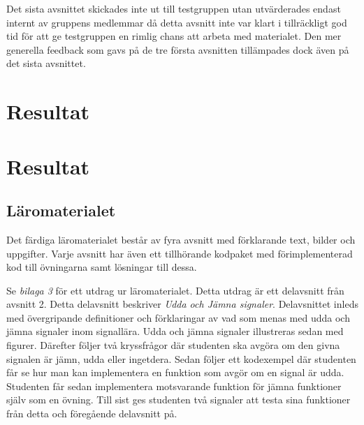 \documentclass[]{article}
\begin{document}
Det sista avsnittet skickades inte ut till testgruppen utan utvärderades endast internt av gruppens medlemmar då detta 
avsnitt inte var klart i tillräckligt god tid för att ge testgruppen en rimlig chans att arbeta med materialet. Den mer 
generella feedback som gavs på de tre första avsnitten tillämpades dock även på det sista avsnittet.


\section{Resultat}


%

\section{Resultat}


%

\subsection{Läromaterialet}
Det färdiga läromaterialet består av fyra avsnitt med förklarande text, bilder och uppgifter. Varje avsnitt har även 
ett tillhörande kodpaket med förimplementerad kod till övningarna samt lösningar till dessa.

Se \textit{bilaga 3} för ett utdrag ur läromaterialet. Detta utdrag är ett delavsnitt från avsnitt 2. Detta delavsnitt 
beskriver \textit{Udda och Jämna signaler}. Delavsnittet inleds med övergripande definitioner och förklaringar av vad 
som menas med udda och jämna signaler inom signallära. Udda och jämna signaler illustreras sedan med figurer. Därefter 
följer två kryssfrågor där studenten ska avgöra om den givna signalen är jämn, udda eller ingetdera. Sedan följer ett 
kodexempel där studenten får se hur man kan implementera en funktion som avgör om en signal är udda. Studenten får sedan 
implementera motsvarande funktion för jämna funktioner själv som en övning. Till sist ges studenten två signaler att 
testa sina funktioner från detta och föregående delavsnitt på.
\end{document}
